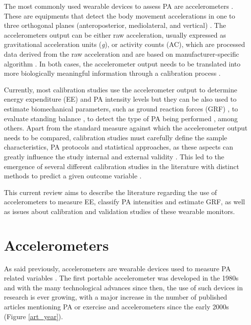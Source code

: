 \documentclass[12pt]{article}
\begin{document}
The most commonly used wearable devices to assess PA are accelerometers . These are equipments that detect the body movement accelerations in one to three orthogonal planes (anteroposterior, mediolateral, and vertical) . The accelerometers output can be either raw acceleration, usually expressed as gravitational acceleration units (\textit{g}), or activity counts (AC), which are processed data derived from the raw acceleration and are based on manufacturer-specific algorithm . In both cases, the accelerometer output needs to be translated into more biologically meaningful information through a calibration process .

Currently, most calibration studies use the accelerometer output to determine energy expenditure (EE) and PA intensity levels  but they can be also used to estimate biomechanical parameters, such as ground reaction forces (GRF) , to evaluate standing balance , to detect the type of PA being performed , among others. Apart from the standard measure against which the accelerometer output needs to be compared, calibration studies must carefully define the sample characteristics, PA protocols and statistical approaches, as these aspects can greatly influence the study internal and external validity . This led to the emergence of several different calibration studies in the literature with distinct methods to predict a given outcome variable .

This current review aims to describe the literature regarding the use of accelerometers to measure EE, classify PA intensities and estimate GRF, as well as issues about calibration and validation studies of these wearable monitors. 

\section*{Accelerometers}

As said previously, accelerometers are wearable devices used to measure PA related variables . The first portable accelerometer was developed in the 1980s  and with the many technological advances since then, the use of such devices in research is ever growing, with a major increase in the number of published articles mentioning PA or exercise and accelerometers since the early 2000s (Figure \ref{art_year}).
\end{document}
